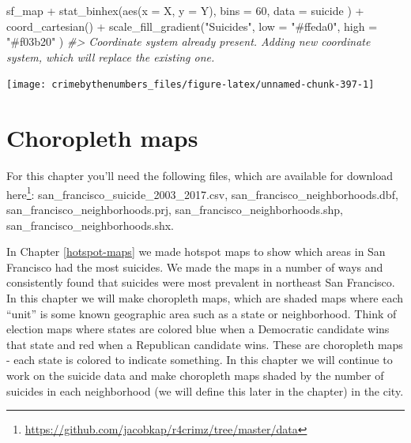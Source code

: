 \documentclass[
]{krantz}
\makeatletter
\newenvironment{Shaded}{\begin{snugshade}}{\end{snugshade}}
\newcommand{\AttributeTok}[1]{\textcolor[rgb]{0.61,0.61,0.61}{#1}}
\newcommand{\CommentTok}[1]{\textcolor[rgb]{0.37,0.37,0.37}{\textit{#1}}}
\newcommand{\DecValTok}[1]{\textcolor[rgb]{0.06,0.06,0.06}{#1}}
\newcommand{\FunctionTok}[1]{\textcolor[rgb]{0,0,0}{#1}}
\newcommand{\NormalTok}[1]{#1}
\newcommand{\SpecialCharTok}[1]{\textcolor[rgb]{0,0,0}{#1}}
\newcommand{\StringTok}[1]{\textcolor[rgb]{0.5,0.5,0.5}{#1}}
\renewcommand{\href}[2]{#2\footnote{\url{#1}}}
\newenvironment{kframe}{%
\medskip{}
\setlength{\fboxsep}{.8em}
 \def\at@end@of@kframe{}%
 \ifinner\ifhmode%
  \def\at@end@of@kframe{\end{minipage}}%
  \begin{minipage}{\columnwidth}%
 \fi\fi%
 \def\FrameCommand##1{\hskip\@totalleftmargin \hskip-\fboxsep
 \colorbox{shadecolor}{##1}\hskip-\fboxsep
     \hskip-\linewidth \hskip-\@totalleftmargin \hskip\columnwidth}%
 \MakeFramed {\advance\hsize-\width
   \@totalleftmargin\z@ \linewidth\hsize
   \@setminipage}}%
 {\par\unskip\endMakeFramed%
 \at@end@of@kframe}
\renewenvironment{Shaded}{\begin{kframe}}{\end{kframe}}
\makeatother
\begin{document}
\begin{Shaded}
\begin{Highlighting}[]
\NormalTok{sf\_map }\SpecialCharTok{+}
  \FunctionTok{stat\_binhex}\NormalTok{(}\FunctionTok{aes}\NormalTok{(}\AttributeTok{x =}\NormalTok{ X, }\AttributeTok{y =}\NormalTok{ Y),}
    \AttributeTok{bins =} \DecValTok{60}\NormalTok{,}
    \AttributeTok{data =}\NormalTok{ suicide}
\NormalTok{  ) }\SpecialCharTok{+}
  \FunctionTok{coord\_cartesian}\NormalTok{() }\SpecialCharTok{+}
  \FunctionTok{scale\_fill\_gradient}\NormalTok{(}\StringTok{"Suicides"}\NormalTok{,}
    \AttributeTok{low =} \StringTok{"\#ffeda0"}\NormalTok{,}
    \AttributeTok{high =} \StringTok{"\#f03b20"}
\NormalTok{  )}
\CommentTok{\#\textgreater{} Coordinate system already present. Adding new coordinate system, which will replace the existing one.}
\end{Highlighting}
\end{Shaded}

\begin{center}\texttt{[image: crimebythenumbers\_files/figure-latex/unnamed-chunk-397-1]} \end{center}

\hypertarget{choropleth-maps}{%
\chapter{Choropleth maps}\label{choropleth-maps}}

For this chapter you'll need the following files, which are
available for download
\href{https://github.com/jacobkap/r4crimz/tree/master/data}{here}:
san\_francisco\_suicide\_2003\_2017.csv,
san\_francisco\_neighborhoods.dbf,
san\_francisco\_neighborhoods.prj,
san\_francisco\_neighborhoods.shp,
san\_francisco\_neighborhoods.shx.

In Chapter \ref{hotspot-maps} we made hotspot maps to show
which areas in San Francisco had the most suicides. We made
the maps in a number of ways and consistently found that
suicides were most prevalent in northeast San Francisco. In
this chapter we will make choropleth maps, which are shaded
maps where each ``unit'' is some known geographic area such
as a state or neighborhood. Think of election maps where
states are colored blue when a Democratic candidate wins
that state and red when a Republican candidate wins. These
are choropleth maps - each state is colored to indicate
something. In this chapter we will continue to work on the
suicide data and make choropleth maps shaded by the number
of suicides in each neighborhood (we will define this later
in the chapter) in the city.
\end{document}
